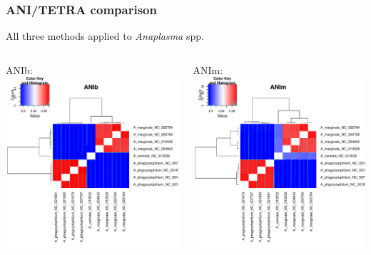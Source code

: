 \begin{frame}
  \frametitle{ANI/TETRA comparison}
  All three methods applied to \textit{Anaplasma} spp.\\[0.25cm]
  \begin{columns}[T]
    \begin{column}{4cm}
    ANIb:\\
      \includegraphics[width=1\textwidth]{images/ANIb}
    \end{column}
    \begin{column}{4cm}
    ANIm:\\
      \includegraphics[width=1\textwidth]{images/ANIm}

\end{column}
\end{columns}
\end{frame}
